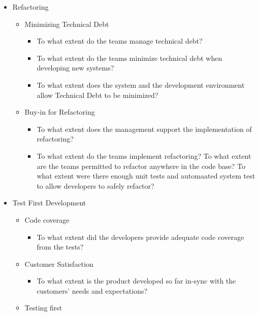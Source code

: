 \begin{appendices}
\begin{itemize}
	\item Refactoring 
		\begin{itemize}
			\item Minimizing Technical Debt 
				\begin{itemize}
					\item To what extent do the teams manage technical debt? 
					\item To what extent do the teams minimize technical debt when developing new systems? 
					\item To what extent does the system and the development environment allow Technical Debt to be minimized? 
				\end{itemize}
			\item Buy-in for Refactoring 
				\begin{itemize}
					\item To what extent does the management support the implementation of refactoring? 
					\item To what extent do the teams implement refactoring? 
					\addition To what extent are the teams permitted to refactor anywhere in the code base?			
					\addition To what extent were there enough unit tests and automaated system test to allow developers to safely refactor?					
				\end{itemize}
		\end{itemize}
	\item Test First Development
		\begin{itemize}
			\item Code coverage
				\begin{itemize}
					\item To what extent did the developers provide adequate code coverage from the tests?
				\end{itemize}
		\end{itemize}
		\begin{itemize}
			\item Customer Satisfaction
				\begin{itemize}
					\item To what extent is the product developed so far in-sync with the customers' needs and expectations?
				\end{itemize}
		\end{itemize}
		\begin{itemize}
			\item Testing first

\end{itemize}
\end{itemize}
\end{appendices}
